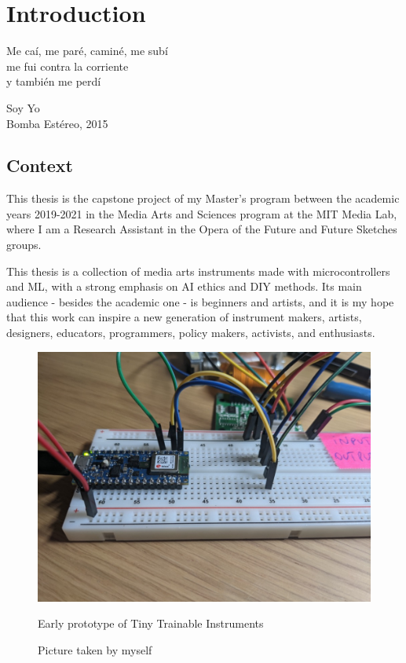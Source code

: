 \chapter{Introduction}

\epigraph{Me caí, me paré, caminé, me subí \\ me fui contra la corriente \\ y también me perdí}{Soy Yo \\ Bomba Estéreo, 2015}

\section{Context}

This thesis is the capstone project of my Master's program between the academic years 2019-2021 in the Media Arts and Sciences program at the MIT Media Lab, where I am a Research Assistant in the Opera of the Future and Future Sketches groups.

This thesis is a collection of media arts instruments made with microcontrollers and \acrfull{ML}, with a strong emphasis on \acrfull{AI} ethics and \acrfull{DIY} methods. Its main audience - besides the academic one - is beginners and artists, and it is my hope that this work can inspire a new generation of instrument makers, artists, designers, educators, programmers, policy makers, activists, and enthusiasts.

\begin{figure}[ht]
  \centering
  \includegraphics[width=0.75\linewidth,height=0.25\textheight,keepaspectratio]{images/tiny-trainable-instruments-early-protoype.jpg}
  \caption{Early prototype of Tiny Trainable Instruments}
  \caption*{Picture taken by myself}
  \label{fig:tiny-trainable-instruments-early-protoype}
\end{figure}

